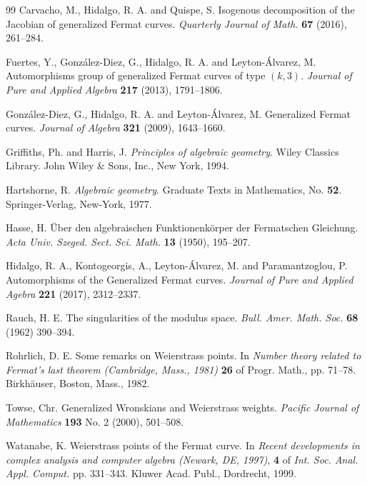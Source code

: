 \documentclass{amsart}
\begin{document}
\begin{thebibliography}{99}
Carvacho, M.,  Hidalgo, R. A. and Quispe, S.
Isogenous decomposition of the Jacobian of generalized Fermat curves.
{\it  Quarterly Journal of Math.} {\bf 67} (2016), 261--284.
	
	

Fuertes, Y., Gonz{\'a}lez-Diez, G.,  Hidalgo, R. A. and Leyton-{\'A}lvarez, M.
Automorphisms group of generalized Fermat curves of type $(k,3)$.
{\it Journal of Pure and Applied Algebra} {\bf 217} (2013), 1791--1806.

Gonz{\'a}lez-Diez, G., Hidalgo, R. A. and Leyton-{\'A}lvarez, M.
Generalized Fermat curves.
{\it Journal of Algebra} {\bf 321} (2009), 1643--1660.
	

Griffiths, Ph. and Harris, J.
{\it Principles of algebraic geometry}.
Wiley Classics Library.
John Wiley \& Sons, Inc., New York, 1994.
	
Hartshorne, R.
{\it Algebraic geometry}.
Graduate Texts in Mathematics, No. {\bf 52}.
Springer-Verlag, New-York, 1977.
	
	   	
	
Hasse, H.
\"Uber den algebraischen Funktionenk\"orper der Fermatschen Gleichung.
{\it Acta Univ. Szeged. Sect. Sci. Math.} {\bf 13} (1950), 195--207.
	
	

Hidalgo, R. A.,  Kontogeorgis, A.,  Leyton-{\'A}lvarez, M. and Paramantzoglou, P.
Automorphisms of the Generalized Fermat curves.
{\it Journal of Pure and Applied Agebra} {\bf 221} (2017), 2312--2337.

Rauch, H. E. 
The singularities of the modulus space. 
{\it Bull. Amer. Math. Soc.} {\bf 68} (1962) 390--394.
	
		
Rohrlich, D. E.
Some remarks on Weierstrass points.
In {\it Number theory related to Fermat's last theorem (Cambridge, Mass., 1981)} {\bf 26} of Progr. Math., pp. 71--78. 
Birkh{\"a}user, Boston, Mass., 1982.


Towse, Chr.
Generalized Wronskians and Weierstrass weights.
{\it Pacific Journal of Mathematics} {\bf 193} No. 2 (2000), 501--508.



Watanabe, K.
Weierstrass points of the Fermat curve. 
In {\it Recent developments in complex analysis and computer algebra (Newark, {DE}, 1997)}, {\bf 4} of 
{\it Int. Soc. Anal. Appl. Comput.} pp. 331--343.
Kluwer Acad. Publ., Dordrecht, 1999.


\end{thebibliography}
\end{document}
